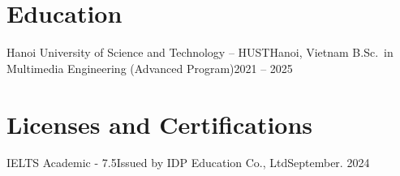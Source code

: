 \section{Education}
  \resumeSubHeadingListStart
    \resumeSubheading
      {Hanoi University of Science and Technology – HUST}{Hanoi, Vietnam}
      {B.Sc.\ in Multimedia Engineering (Advanced Program)}{2021 -- 2025}
  \resumeSubHeadingListEnd

\section{Licenses and Certifications}
\resumeSubHeadingListStart
    \resumeSubheading
      {IELTS Academic - 7.5}{}{Issued by IDP Education Co., Ltd}{September. 2024}
\resumeSubHeadingListEnd
